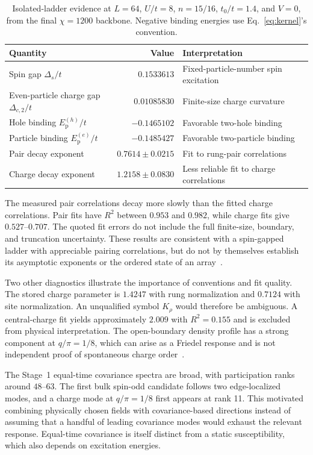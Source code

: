 \documentclass[11pt,letterpaper]{article}
\newcommand{\Ep}{E_{\mathrm p}}
\begin{document}
\begin{table}[htbp]
\centering
\caption{Isolated-ladder evidence at $L=64$, $U/t=8$, $n=15/16$,
$t_0/t=1.4$, and $V=0$, from the final $\chi=1200$ backbone.
Negative binding energies use Eq.~\eqref{eq:kernel}'s convention.}
\label{tab:bare}
\begin{tabularx}{\textwidth}{l r Y}
\toprule
Quantity & Value & Interpretation \\
\midrule
Spin gap $\Delta_s/t$ & $0.1533613$ & Fixed-particle-number spin excitation \\
Even-particle charge gap $\Delta_{c,2}/t$ & $0.01085830$ & Finite-size charge curvature \\
Hole binding $\Ep^{(h)}/t$ & $-0.1465102$ & Favorable two-hole binding \\
Particle binding $\Ep^{(e)}/t$ & $-0.1485427$ & Favorable two-particle binding \\
Pair decay exponent & $0.7614\pm0.0215$ & Fit to rung-pair correlations \\
Charge decay exponent & $1.2158\pm0.0830$ & Less reliable fit to charge correlations \\
\bottomrule
\end{tabularx}
\end{table}

The measured pair correlations decay more slowly than the fitted charge
correlations. Pair fits have $R^2$ between $0.953$ and $0.982$, while charge
fits give $0.527$--$0.707$. The quoted fit errors do not include the full
finite-size, boundary, and truncation uncertainty. These results are
consistent with a spin-gapped ladder with appreciable pairing correlations,
but do not by themselves establish its asymptotic exponents or the ordered
state of an array~\citep{Dolfi2015,Shen2023}.

Two other diagnostics illustrate the importance of conventions and fit
quality. The stored charge parameter is $1.4247$ with rung normalization and
$0.7124$ with site normalization. An unqualified symbol $K_\rho$ would
therefore be ambiguous. A central-charge fit yields approximately $2.009$
with $R^2=0.155$ and is excluded from physical interpretation. The
open-boundary density profile has a strong component at $q/\pi=1/8$,
which can arise as a Friedel response and is not independent proof of
spontaneous charge order~\citep{WhiteAffleckScalapino2002}.

The Stage~1 equal-time covariance spectra are broad, with participation
ranks around $48$--$63$. The first bulk spin-odd candidate follows two
edge-localized modes, and a charge mode at $q/\pi=1/8$ first appears at rank
11. This motivated combining physically chosen fields with covariance-based
directions instead of assuming that a handful of leading covariance modes
would exhaust the relevant response. Equal-time covariance is itself distinct
from a static susceptibility, which also depends on excitation energies.
\end{document}
